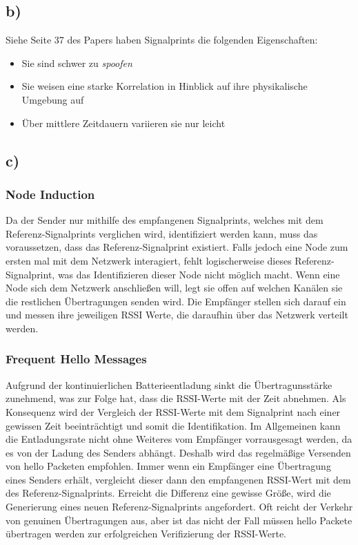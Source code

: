 \documentclass[12pt,a4paper]{article}
\begin{document}
\subsection{b)} 
Siehe Seite 37 des Papers haben Signalprints die folgenden 
Eigenschaften:

\begin{itemize}
	\item Sie sind schwer zu \textit{spoofen} 
	\item Sie weisen eine starke Korrelation in Hinblick auf ihre 
	physikalische Umgebung auf
	\item Über mittlere Zeitdauern variieren sie nur leicht 
\end{itemize}


\subsection{c)} 

\subsubsection*{Node Induction}
Da der Sender nur mithilfe des empfangenen Signalprints,
welches mit dem Referenz-Signalprints verglichen wird, 
identifiziert werden kann, muss das voraussetzen, dass 
das Referenz-Signalprint existiert. Falls jedoch eine 
Node zum ersten mal mit dem Netzwerk interagiert, fehlt 
logischerweise dieses Referenz-Signalprint, was das 
Identifizieren dieser Node nicht möglich macht. 
Wenn eine Node sich dem Netzwerk anschließen will, legt 
sie offen auf welchen Kanälen sie die restlichen 
Übertragungen senden wird. Die Empfänger stellen sich 
darauf ein und messen ihre jeweiligen RSSI Werte, die 
daraufhin über das Netzwerk verteilt werden. 

\subsubsection*{Frequent Hello Messages}
Aufgrund der kontinuierlichen Batterieentladung sinkt 
die Übertragunsstärke zunehmend, was zur Folge hat, 
dass die RSSI-Werte mit der Zeit abnehmen. 
Als Konsequenz wird der Vergleich der RSSI-Werte mit 
dem Signalprint nach einer gewissen Zeit beeinträchtigt 
und somit die Identifikation.
Im Allgemeinen kann die Entladungsrate nicht ohne Weiteres 
vom Empfänger vorrausgesagt werden, da es von der Ladung 
des Senders abhängt. Deshalb wird das regelmäßige Versenden 
von  \glqq hello\grqq \hspace{0.5mm} Packeten empfohlen.
Immer wenn ein Empfänger eine Übertragung eines Senders erhält, 
vergleicht dieser dann den empfangenen RSSI-Wert mit dem des 
Referenz-Signalprints. Erreicht die Differenz eine gewisse 
Größe, wird die Generierung eines neuen Referenz-Signalprints 
angefordert. Oft reicht der Verkehr von genuinen Übertragungen 
aus, aber ist das nicht der Fall müssen \glqq hello\grqq
\hspace{0.5mm}Packete übertragen werden zur erfolgreichen 
Verifizierung der RSSI-Werte.
\end{document}
